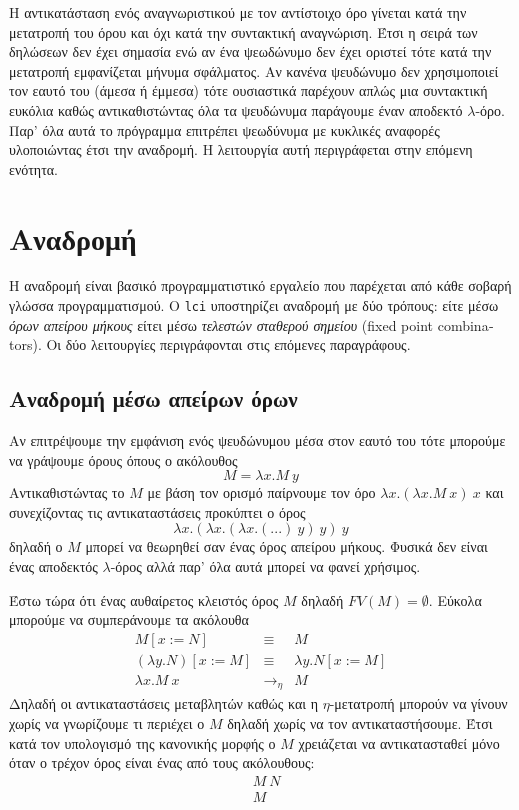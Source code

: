 \documentclass[a4paper,11pt]{article}
\newcommand{\la}{$\lambda$}
\newcommand{\lci}{\texttt{\en{lci}}}
\newcommand{\en}[1]{\textlatin{#1}}
\begin{document}
Η αντικατάσταση ενός αναγνωριστικού με τον αντίστοιχο όρο γίνεται κατά την μετατροπή
του όρου και όχι κατά την συντακτική αναγνώριση. Έτσι η σειρά των δηλώσεων δεν έχει
σημασία ενώ αν ένα ψεωδώνυμο δεν έχει οριστεί τότε κατά την μετατροπή εμφανίζεται
μήνυμα σφάλματος. Αν κανένα ψευδώνυμο δεν χρησιμοποιεί τον εαυτό του (άμεσα ή έμμεσα)
τότε ουσιαστικά παρέχουν απλώς μια συντακτική ευκόλια καθώς αντικαθιστώντας όλα τα
ψευδώνυμα παράγουμε έναν αποδεκτό \la-όρο. Παρ' όλα
αυτά το πρόγραμμα επιτρέπει ψεωδύνυμα με κυκλικές αναφορές υλοποιώντας έτσι την
αναδρομή. Η λειτουργία αυτή περιγράφεται στην επόμενη ενότητα.

\section{Αναδρομή}
Η αναδρομή είναι βασικό προγραμματιστικό εργαλείο που παρέχεται από κάθε σοβαρή γλώσσα
προγραμματισμού. Ο \lci{} υποστηρίζει αναδρομή με δύο τρόπους: είτε μέσω
\emph{όρων απείρου μήκους} είτει μέσω \emph{τελεστών σταθερού σημείου}
(\en{fixed point combinators}). Οι δύο λειτουργίες περιγράφονται στις επόμενες
παραγράφους.

\subsection{Αναδρομή μέσω απείρων όρων}
Αν επιτρέψουμε την εμφάνιση ενός ψευδώνυμου μέσα στον εαυτό του τότε μπορούμε
να γράψουμε όρους όπους ο ακόλουθος
\[ M = \lambda x.M\ y \]
Αντικαθιστώντας το $M$ με βάση τον ορισμό παίρνουμε τον όρο $\lambda x.(\lambda x.M\ x)\ x$
και συνεχίζοντας τις αντικαταστάσεις προκύπτει ο όρος
\[ \lambda x.(\lambda x.(\lambda x.(...)\ y)\ y)\ y \]
δηλαδή ο $M$ μπορεί να θεωρηθεί σαν ένας όρος απείρου μήκους. Φυσικά δεν είναι ένας
αποδεκτός \la-όρος αλλά παρ' όλα αυτά μπορεί να φανεί χρήσιμος.

Έστω τώρα ότι ένας αυθαίρετος κλειστός όρος $M$ δηλαδή $FV(M) = \emptyset$. Εύκολα
μπορούμε να συμπεράνουμε τα ακόλουθα
\[
	\begin{array}{lcl}
		M[x:=N] & \equiv & M \\
		(\lambda y.N)[x:=M] & \equiv & \lambda y.N[x:=M] \\
		\lambda x.M\ x & \rightarrow_\eta & M
	\end{array}
\]
Δηλαδή οι αντικαταστάσεις μεταβλητών καθώς και η $\eta$-μετατροπή μπορούν να γίνουν
χωρίς να γνωρίζουμε τι περιέχει ο $M$ δηλαδή χωρίς να τον αντικαταστήσουμε. Έτσι
κατά τον υπολογισμό της κανονικής μορφής ο $Μ$ χρειάζεται να αντικατασταθεί μόνο
όταν ο τρέχον όρος είναι ένας από τους ακόλουθους:
\begin{eqnarray}
	& M\ N \\
	& M
\end{eqnarray}
\end{document}
